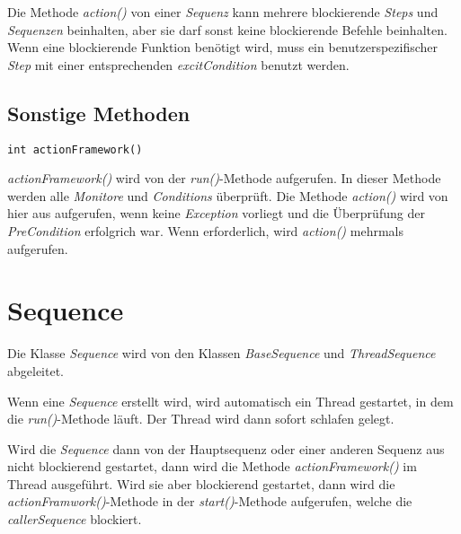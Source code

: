 Die Methode \textit{action()} von einer \textit{Sequenz} kann mehrere blockierende \textit{Steps} und \textit{Sequenzen} beinhalten, aber sie darf sonst keine blockierende Befehle beinhalten.
Wenn eine blockierende Funktion benötigt wird, muss ein benutzerspezifischer \textit{Step} mit einer entsprechenden \textit{excitCondition} benutzt werden.



\subsection{Sonstige Methoden}
\begin{lstlisting}
int actionFramework()
\end{lstlisting}
\textit{actionFramework()} wird von der \textit{run()}-Methode aufgerufen.
In dieser Methode werden alle \textit{Monitore} und \textit{Conditions} überprüft.
Die Methode \textit{action()} wird von hier aus aufgerufen, wenn keine \textit{Exception} vorliegt und die Überprüfung der \textit{PreCondition} erfolgrich war.
Wenn erforderlich, wird \textit{action()} mehrmals aufgerufen.



%
%







\section{Sequence}
Die Klasse \textit{Sequence} wird von den Klassen \textit{BaseSequence} und \textit{ThreadSequence} abgeleitet.

Wenn eine \textit{Sequence} erstellt wird, wird automatisch ein Thread gestartet, in dem die \textit{run()}-Methode läuft.
Der Thread wird dann sofort schlafen gelegt.

Wird die \textit{Sequence} dann von der Hauptsequenz oder einer anderen Sequenz aus nicht blockierend gestartet, dann wird die Methode \textit{actionFramework()} im Thread ausgeführt.
Wird sie aber blockierend gestartet, dann wird die \textit{actionFramwork()}-Methode in der \textit{start()}-Methode aufgerufen, welche die \textit{callerSequence} blockiert.



